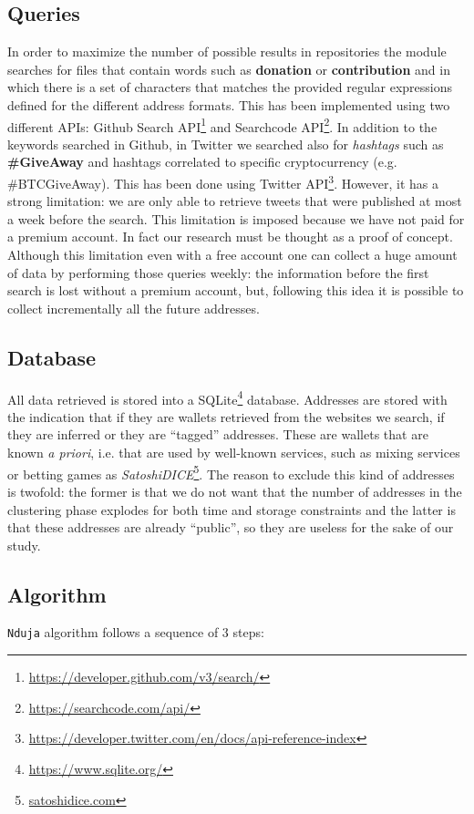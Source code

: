 \subsection{Queries}
\label{sec:queries}
In order to maximize the number of possible results in repositories the module
\walletcollector{} searches for files that contain words such as
\textbf{donation} or \textbf{contribution} and in which there is a set of
characters that matches the provided regular expressions defined for the
different address formats. This has been implemented using two different APIs:
Github Search API\footnote{\url{https://developer.github.com/v3/search/}} and
Searchcode API\footnote{\url{https://searchcode.com/api/}}.
In addition to the keywords searched in Github, in Twitter we searched also for
\textit{hashtags} such as \textbf{\#GiveAway} and
hashtags correlated to specific cryptocurrency (e.g. \#BTCGiveAway). This has
been done using Twitter
API\footnote{\url{https://developer.twitter.com/en/docs/api-reference-index}}.
However, it has a strong limitation: we are only able to retrieve tweets that
were published at most a week before the search. This limitation is imposed
because we have not paid for a premium account. In fact our research must be
thought as a proof of concept.
Although this limitation even with a free account one can collect a huge amount
of data by performing those queries weekly:
the information before the first search is lost without a premium account, but,
following this idea it is possible to collect incrementally all the future
addresses.

\subsection{Database}
All data retrieved is stored into a
SQLite\footnote{\url{https://www.sqlite.org/}} database. Addresses are stored
with the indication that if they are wallets retrieved from the websites we
search, if they are inferred or they are ``tagged'' addresses. These are
wallets that are known \emph{a priori}, i.e. that are used by well-known
services, such as mixing services or betting games as
\textit{SatoshiDICE}\footnote{\url{satoshidice.com}}.
The reason to exclude this kind of addresses is twofold: the former is that we
do not want that the number of addresses in the clustering phase explodes for
both time and storage constraints and the latter is that these
addresses are already ``public'', so they are useless for the sake of our study.

\subsection{Algorithm}
\texttt{Nduja} algorithm follows a sequence of 3 steps:

